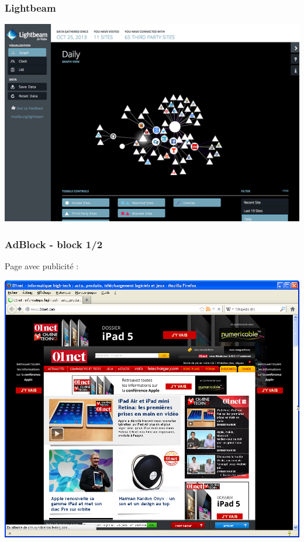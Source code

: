 \documentclass{beamer}
\begin{document}
\begin{frame}
\frametitle{Lightbeam}
\begin{center}
\includegraphics[scale=0.5] {./images/lightbeam.png}
\end{center}
\end{frame}

\begin{frame}
\frametitle{AdBlock - block 1/2}
Page avec publicité :
\begin{center}
\includegraphics[scale=0.4] {./images/Adblock01.png}
\end{center}

\end{frame}
\end{document}
